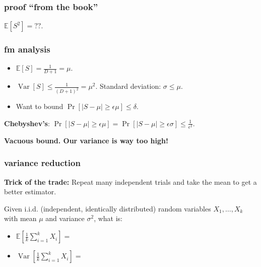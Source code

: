 \documentclass[handout,compress]{beamer}
\newcommand{\E}{\mathbb{E}}
\DeclareMathOperator{\Var}{Var}
\begin{document}
\begin{frame}
	\frametitle{proof ``from the book''}
	$\E[S^2] = ??$.
	\begin{center}
	\end{center}
\end{frame}

\begin{frame}
	\frametitle{fm analysis}
	\begin{itemize}
		\item $\E[S] = \frac{1}{D+1} = \mu.$
		\item $\Var[S] \leq \frac{1}{(D+1)^2} = \mu^2$. Standard deviation: $\sigma \leq \mu$.
		\item Want to bound $\Pr[|S - \mu| \geq \epsilon \mu] \leq \delta$.
	\end{itemize}
	
	\textbf{Chebyshev's}: $\Pr[|S - \mu| \geq \epsilon \mu] = \Pr[|S - \mu| \geq \epsilon \sigma] \leq \frac{1}{\epsilon^2}$.
	
	\begin{center}
	\alert{\textbf{Vacuous bound. Our variance is way too high!}}
	\end{center}
\end{frame}


\begin{frame}
	\frametitle{variance reduction}
	\textbf{Trick of the trade:} Repeat many independent trials and take the mean to get a better estimator.
	
	Given i.i.d. (independent, identically distributed) random variables $X_1, \ldots, X_k$ with mean $\mu$ and variance $\sigma^2$, what is:
	\begin{itemize}
		\item $\E\left[\frac{1}{k}\sum_{i=1}^k X_i\right] = $
		\vspace{1em}
		\item $\Var\left[\frac{1}{k}\sum_{i=1}^k X_i\right] = $
	\end{itemize} 
\end{frame}
\end{document}
